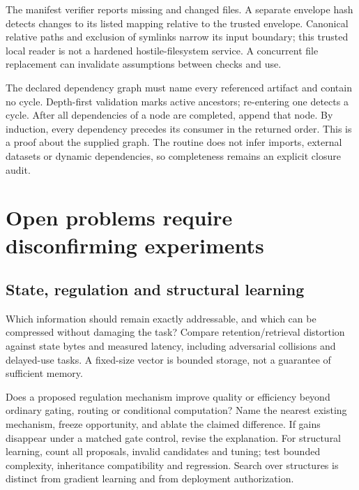 The manifest verifier reports missing and changed files. A separate envelope
hash detects changes to its listed mapping relative to the trusted envelope.
Canonical relative paths and exclusion of symlinks narrow its input boundary;
this trusted local reader is not a hardened hostile-filesystem service. A
concurrent file replacement can invalidate assumptions between checks and use.


The declared dependency graph must name every referenced artifact and contain
no cycle. Depth-first validation marks active ancestors; re-entering one detects
a cycle. After all dependencies of a node are completed, append that node.
By induction, every dependency precedes its consumer in the returned order.
This is a proof about the supplied graph. The routine does not infer imports,
external datasets or dynamic dependencies, so completeness remains an explicit
closure audit.

\section{Open problems require disconfirming experiments}
\subsection{State, regulation and structural learning}
Which information should remain exactly addressable, and which can be
compressed without damaging the task? Compare retention/retrieval distortion
against state bytes and measured latency, including adversarial collisions
and delayed-use tasks. A fixed-size vector is bounded storage, not a guarantee
of sufficient memory.

Does a proposed regulation mechanism improve quality or efficiency beyond
ordinary gating, routing or conditional computation? Name the nearest existing
mechanism, freeze opportunity, and ablate the claimed difference. If gains
disappear under a matched gate control, revise the explanation. For structural
learning, count all proposals, invalid candidates and tuning; test bounded
complexity, inheritance compatibility and regression. Search over structures
is distinct from gradient learning and from deployment authorization.

